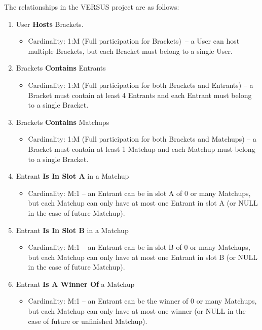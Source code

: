 \documentclass[11pt]{article}
\begin{document}
The relationships in the VERSUS project are as follows:

\begin{enumerate}
    \item User \textbf{Hosts} Brackets. 
        \begin{itemize}
            \item Cardinality: 1:M (Full participation for Brackets) – a User can host multiple Brackets, but each Bracket must belong to a single User.
        \end{itemize}
    \item Brackets \textbf{Contains} Entrants
        \begin{itemize}
            \item Cardinality: 1:M (Full participation for both Brackets and Entrants) – a Bracket must contain at least 4 Entrants and each Entrant must belong to a single Bracket.
        \end{itemize}
    \item Brackets \textbf{Contains} Matchups
        \begin{itemize}
            \item Cardinality: 1:M (Full participation for both Brackets and Matchups) – a Bracket must contain at least 1 Matchup and each Matchup must belong to a single Bracket.
        \end{itemize}
    \item Entrant \textbf{Is In Slot A} in a Matchup
        \begin{itemize}
            \item Cardinality: M:1 – an Entrant can be in slot A of 0 or many Matchups, but each Matchup can only have at most one Entrant in slot A (or NULL in the case of future Matchup).
        \end{itemize}
    \item Entrant \textbf{Is In Slot B} in a Matchup
        \begin{itemize}
            \item Cardinality: M:1 – an Entrant can be in slot B of 0 or many Matchups, but each Matchup can only have at most one Entrant in slot B (or NULL in the case of future Matchup).
        \end{itemize}
    \item Entrant \textbf{Is A Winner Of} a Matchup
        \begin{itemize}
            \item Cardinality: M:1 – an Entrant can be the winner of 0 or many Matchups, but each Matchup can only have at most one winner (or NULL in the case of future or unfinished Matchup).

\end{itemize}
\end{enumerate}
\end{document}
